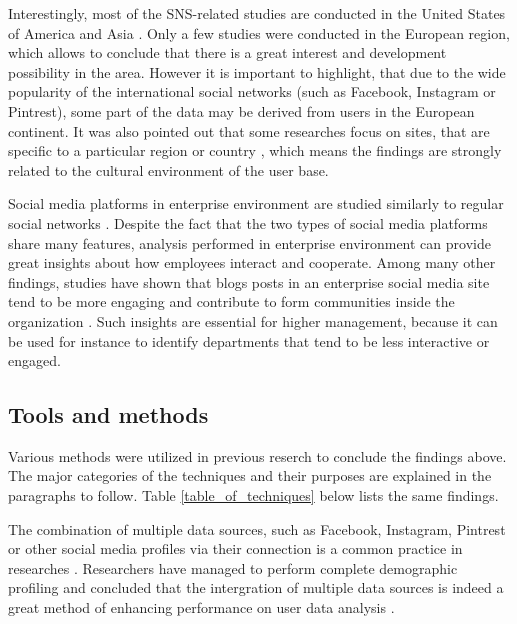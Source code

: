 \documentclass[conference]{IEEEtran}
\begin{document}
Interestingly, most of the SNS-related studies are conducted in the United States of America and Asia \cite{waheed2017investigation}. Only a few studies were conducted in the European region, which allows to conclude that there is a great interest and development possibility in the area. However it is important to highlight, that due to the wide popularity of the international social networks (such as Facebook, Instagram or Pintrest), some part of the data may be derived from users in the European continent. It was also pointed out that some researches focus on sites, that are specific to a particular region or country \cite{waheed2017investigation}, which means the findings are strongly related to the cultural environment of the user base.    

Social media platforms in enterprise environment are studied similarly to regular social networks \cite{guy2016whatsyourorganizationlike}. Despite the fact that the two types of social media platforms share many features, analysis performed in enterprise environment can provide great insights about how employees interact and cooperate. Among many other findings, studies have shown that blogs posts in an enterprise social media site tend to be more engaging and contribute to form communities inside the organization \cite{guy2016whatsyourorganizationlike}. Such insights are essential for higher management, because it can be used for instance to identify departments that tend to be less interactive or engaged.  

\subsection{Tools and methods}
Various methods were utilized in previous reserch to conclude the findings above. The major categories of the techniques and their purposes are explained in the paragraphs to follow. Table \ref{table_of_techniques} below lists the same findings.

   The combination of multiple data sources, such as Facebook, Instagram, Pintrest or other social media profiles via their connection is a common practice in researches \cite{farseev2015harvestingmultiplesources, ottoni2013ladies}. Researchers have managed to perform complete demographic profiling and concluded that the intergration of multiple data sources is indeed a great method of enhancing performance on user data analysis \cite{farseev2015harvestingmultiplesources}. 
  
\end{document}
